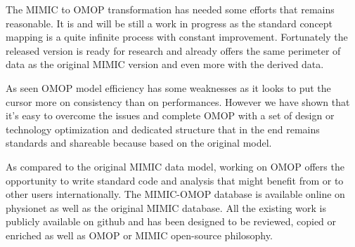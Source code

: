 The MIMIC to OMOP transformation has needed some efforts that remains
reasonable. It is and will be still a work in progress as the standard concept
mapping is a quite infinite process with constant improvement. Fortunately the
released version is ready for research and already offers the same perimeter of
data as the original MIMIC version and even more with the derived data.

As seen OMOP model efficiency has some weaknesses as it looks to put the cursor
more on consistency than on performances. However we have shown that it's easy
to overcome the issues and complete OMOP with a set of design or technology
optimization and dedicated structure that in the end remains standards and
shareable because based on the original model.

As compared to the original MIMIC data model, working on OMOP offers the
opportunity to write standard code and analysis that might benefit from or to
other users internationally. The MIMIC-OMOP database is available online on
physionet as well as the original MIMIC database. All the existing work is
publicly available on github and has been designed to be reviewed, copied or
enriched as well as OMOP or MIMIC open-source philosophy.

